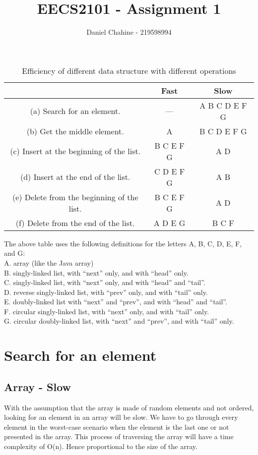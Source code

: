 \documentclass{article}
\title{EECS2101 - Assignment 1}
\author{Daniel Chahine - 219598994}
\begin{document}
\maketitle


\begin{table}[h!]
\setlength{\tabcolsep}{25pt}
\renewcommand{\arraystretch}{1.5}
\centering
\begin{tabular}{ ||c|c|c||  }
 \hline
  & \textbf{Fast} & \textbf{Slow}\\ 
 \hline
 (a) Search for an element. & --- & A B C D E F G   \\\hline 
 (b) Get the middle element. & A & B C D E F G  \\\hline
 (c) Insert at the beginning of the list. & B C E F G & A D\\\hline
 (d) Insert at the end of the list. & C D E F G  & A B \\\hline
 (e) Delete from the beginning of the list. & B C E F G & A D \\\hline 
 (f) Delete from the end of the list. & A D E G & B C F \\
 
 \hline
\end{tabular}
\caption{Efficiency of different data structure with different operations}
\label{table:1}
\end{table}

The above table uses the following definitions for the letters A, B, C, D, E, F, and G:\\
A. array (like the Java array)\\
B. singly-linked list, with “next” only, and with “head” only.\\
C. singly-linked list, with “next” only, and with “head” and “tail”.\\
D. reverse singly-linked list, with “prev” only, and with “tail” only.\\
E. doubly-linked list with “next” and “prev”, and with “head” and “tail”.\\
F. circular singly-linked list, with “next” only, and with “tail” only.\\
G. circular doubly-linked list, with “next” and “prev”, and with “tail” only.\\

\section{Search for an element}
\subsection{Array - Slow}
With the assumption that the array is made of random elements and not ordered, looking for an element in an array will be slow. We have to go through every element in the worst-case scenario when the element is the last one or not presented in the array. This process of traversing the array will have a time complexity of O(n). Hence proportional to the size of the array.
\end{document}
